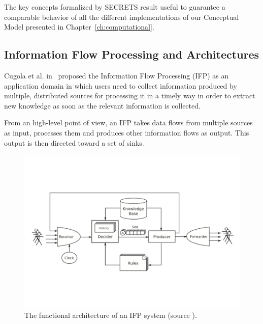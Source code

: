 The key concepts formalized by SECRETS result useful to guarantee a comparable behavior of all the different implementations of our Conceptual Model presented in Chapter~\ref{ch:computational}.

\subsection{Information Flow Processing and Architectures}\label{sec:vel-arch}

Cugola et al. in~\cite{DBLP:journals/csur/CugolaM12} proposed the Information Flow Processing (IFP) as an application domain in which users need to collect information produced by multiple, distributed sources for processing it in a timely way in order to extract new knowledge as soon as the relevant information is collected.

From an high-level point of view, an IFP takes data flows from multiple sources as input, processes them and produces other information flows as output. This output is then directed toward a set of sinks.

\begin{figure}[t]
  \begin{center}
    \includegraphics[width=\textwidth]{img/ifp}
    \caption{The functional architecture of an IFP system (source \cite{DBLP:journals/csur/CugolaM12}).}
    \label{fig:ifp}
  \end{center}
\end{figure}

